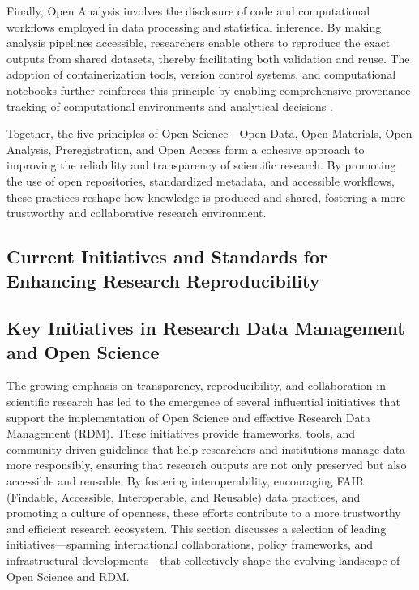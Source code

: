 \documentclass{article}
\begin{document}
Finally, Open Analysis involves the disclosure of code and computational workflows employed in data processing and statistical inference. By making analysis pipelines accessible, researchers enable others to reproduce the exact outputs from shared datasets, thereby facilitating both validation and reuse. The adoption of containerization tools, version control systems, and computational notebooks further reinforces this principle by enabling comprehensive provenance tracking of computational environments and analytical decisions \cite{van_dijk_open_2021, samuel_understanding_2021}.

Together, the five principles of Open Science—Open Data, Open Materials, Open Analysis, Preregistration, and Open Access form a cohesive approach to improving the reliability and transparency of scientific research. By promoting the use of open repositories, standardized metadata, and accessible workflows, these practices reshape how knowledge is produced and shared, fostering a more trustworthy and collaborative research environment.

\subsection{Current Initiatives and Standards for Enhancing Research Reproducibility}

\subsection{Key Initiatives in Research Data Management and Open Science}

The growing emphasis on transparency, reproducibility, and collaboration in scientific research has led to the emergence of several influential initiatives that support the implementation of Open Science and effective Research Data Management (RDM). These initiatives provide frameworks, tools, and community-driven guidelines that help researchers and institutions manage data more responsibly, ensuring that research outputs are not only preserved but also accessible and reusable. By fostering interoperability, encouraging FAIR (Findable, Accessible, Interoperable, and Reusable) data practices, and promoting a culture of openness, these efforts contribute to a more trustworthy and efficient research ecosystem. This section discusses a selection of leading initiatives—spanning international collaborations, policy frameworks, and infrastructural developments—that collectively shape the evolving landscape of Open Science and RDM.
\end{document}
